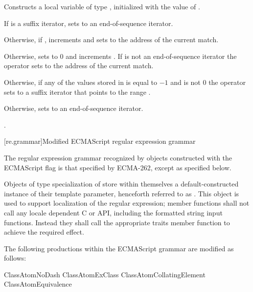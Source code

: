 \begin{itemdescr}
\pnum
\effects
Constructs a local variable  of
type , initialized with the value
of .

\pnum
If  is a suffix iterator, sets  to an
end-of-sequence iterator.

\pnum
Otherwise, if , increments  and
sets  to the address of the current match.

\pnum
Otherwise, sets  to 0 and
increments . If  is not an
end-of-sequence iterator the operator sets  to the
address of the current match.

\pnum
Otherwise, if any of the values stored in  is equal to $-1$ and
 is not 0 the operator sets  to a
suffix iterator that points to the range .

\pnum
Otherwise, sets  to an end-of-sequence iterator.

\pnum
\returns
{}.
\end{itemdescr}

[re.grammar]{Modified ECMAScript regular expression grammar}
%
%

\pnum
{}%
%
The regular expression grammar recognized by
 objects constructed with the ECMAScript
flag is that specified by ECMA-262, except as specified below.

\pnum
{}%
%
Objects of type specialization of  store within themselves a
default-constructed instance of their  template parameter, henceforth
referred to as . This  object is used to support localization
of the regular expression;  member functions shall not call
any locale dependent C or \Cpp{} API, including the formatted string input functions.
Instead they shall call the appropriate traits member function to achieve the required effect.

\pnum
The following productions within the ECMAScript grammar are modified as follows:

\begin{ncrebnf}
\br
  \terminal{-}\br
  ClassAtomNoDash\br
  ClassAtomExClass\br
  ClassAtomCollatingElement\br
  ClassAtomEquivalence
\end{ncrebnf}

